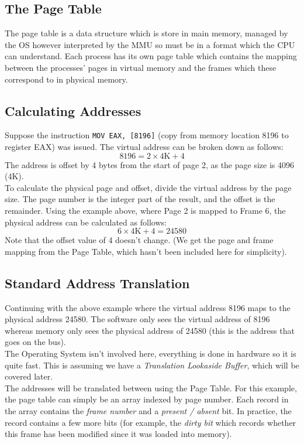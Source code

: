 \subsection{The Page Table}
The page table is a data structure which is store in main memory, managed by the OS however interpreted by the MMU so must be in a format which the CPU can understand. Each process has its own page table which contains the mapping between the processes' pages in virtual memory and the frames which these correspond to in physical memory.

\subsection{Calculating Addresses}
Suppose the instruction \verb|MOV EAX, [8196]| (copy from memory location 8196 to register EAX) was issued. The virtual address can be broken down as follows:
\[8196 = 2 \times 4\mathrm{K} + 4\]
The address is offset by 4 bytes from the start of page 2, as the page size is 4096 (4K).\\

To calculate the physical page and offset, divide the virtual address by the page size. The page number is the integer part of the result, and the offset is the remainder. Using the example above, where Page 2 is mapped to Frame 6, the physical address can be calculated as follows:
\[6 \times 4\mathrm{K} + 4 = 24580\]
Note that the offset value of 4 doesn't change. (We get the page and frame mapping from the Page Table, which hasn't been included here for simplicity).

\subsection{Standard Address Translation}
Continuing with the above example where the virtual address 8196 maps to the physical address 24580. The software only sees the virtual address of 8196 whereas memory only sees the physical address of 24580 (this is the address that goes on the bus).\\

The Operating System isn't involved here, everything is done in hardware so it is quite fast. This is assuming we have a \textit{Translation Lookaside Buffer}, which will be covered later.\\

The addresses will be translated between using the Page Table. For this example, the page table can simply be an array indexed by page number. Each record in the array contains the \textit{frame number} and a \textit{present / absent} bit. In practice, the record contains a few more bits (for example, the \textit{dirty bit} which records whether this frame has been modified since it was loaded into memory). 

